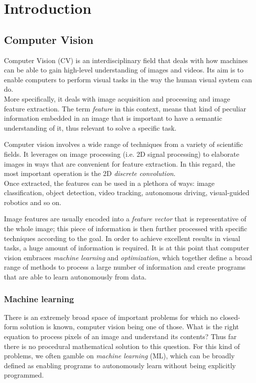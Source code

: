 \chapter{Introduction} %
\label{Chapter1}
\def \teoria {Figures/teoria}
\def \path	 {Figures/C1}


\section{Computer Vision}
Computer Vision (CV) is an interdisciplinary field that deals with how machines can be able to gain high-level understanding of images and videos. Its aim is to enable computers to perform visual tasks in the way the human visual system can do. 
\\
More specifically, it deals with image acquisition and processing and image feature extraction. The term \emph{feature} in this context, means that kind of peculiar information embedded in an image that is important to have a semantic understanding of it, thus relevant to solve a specific task. 
\newline 

Computer vision involves a wide range of techniques from a variety of scientific fields. It leverages on image processing (i.e. 2D signal processing) to elaborate images in ways that are convenient for feature extraction. In this regard, the most important operation is the 2D \emph{discrete convolution}. 
\\
Once extracted, the features can be used in a plethora of ways: image classification, object detection, video tracking, autonomous driving, visual-guided robotics and so on. 
\newline 

Image features are usually encoded into a \emph{feature vector} that is representative of the whole image; this piece of information is then further processed with specific techniques according to the goal. In order to achieve excellent results in visual tasks, a huge amount of information is required. It is at this point that computer vision embraces \emph{machine learning} and \emph{optimization}, which together define a broad range of methods to process a large number of information and create programs that are able to learn autonomously from data. 


\subsection{Machine learning}
There is an extremely broad space of important problems for which no closed-form solution is known, computer vision being one of those. What is the right equation to process pixels of an image and understand its contents? Thus far there is no procedural mathematical solution to this question. For this kind of problems, we often gamble on \emph{machine learning} (ML), which can be broadly defined as enabling programs to autonomously learn without being explicitly programmed. 
\newline 


